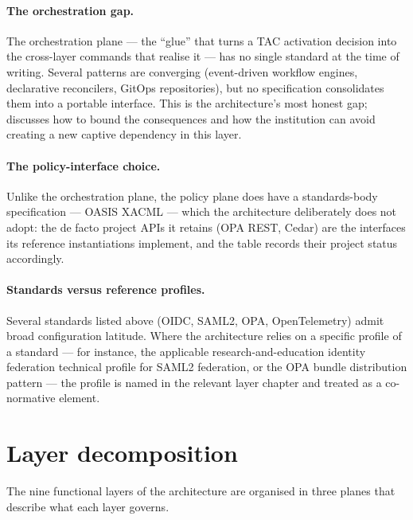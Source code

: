 \paragraph{The orchestration gap.} The orchestration plane --- the
``glue'' that turns a TAC activation decision into the cross-layer
commands that realise it --- has no single standard at the time of
writing. Several patterns are converging (event-driven workflow
engines, declarative reconcilers, GitOps repositories), but no
specification consolidates them into a portable interface. This is
the architecture's most honest gap;  discusses how to bound the consequences and how
the institution can avoid creating a new captive dependency in this
layer.

\paragraph{The policy-interface choice.} Unlike the orchestration
plane, the policy plane does have a standards-body specification ---
OASIS XACML --- which the architecture deliberately does not adopt:
the de facto project APIs it retains (OPA REST, Cedar) are the
interfaces its reference instantiations implement, and the table
records their project status accordingly.

\paragraph{Standards versus reference profiles.} Several standards
listed above (OIDC, SAML2, OPA, OpenTelemetry) admit broad
configuration latitude. Where the architecture relies on a specific
profile of a standard --- for instance, the applicable
research-and-education identity federation technical profile for SAML2
federation, or the OPA bundle distribution pattern --- the
profile is named in the relevant layer chapter and treated as a
co-normative element.

\section{Layer decomposition}
\label{sec:ap-layers}

The nine functional layers of the architecture are organised in three
planes that describe what each layer governs.

